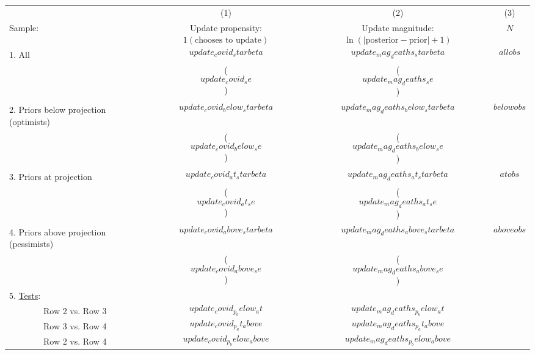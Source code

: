 \begin{tabular}{l c c c}
  \hline
  \hline
 & (1) & (2) & (3) \\ 
  Sample: & \shortstack{Update propensity: \\
  $1(\text{chooses to update})$} & \shortstack{Update magnitude: \\ $\ln(|\text{posterior} -
  \text{prior}|+1)$} & $N$ \\ 
  \hline  
1. All & $$update_covid_starbeta$$ & $$update_mag_deaths_starbeta$$ & $$allobs$$ \\
  & ($$update_covid_se$$) & ($$update_mag_deaths_se$$) \\
  \\
2. Priors below projection (optimists) & $$update_covid_below_starbeta$$
       & $$update_mag_deaths_below_starbeta$$ & 
 $$belowobs$$ \\
  & ($$update_covid_below_se$$) & ($$update_mag_deaths_below_se$$) \\
  \\
3. Priors at projection & $$update_covid_at_starbeta$$ & $$update_mag_deaths_at_starbeta$$
          & $$atobs$$ \\
  & ($$update_covid_at_se$$) & ($$update_mag_deaths_at_se$$) \\
  \\
4. Priors above projection (pessimists) & $$update_covid_above_starbeta$$ & $$update_mag_deaths_above_starbeta$$
          & $$aboveobs$$ \\
  & ($$update_covid_above_se$$) & ($$update_mag_deaths_above_se$$) \\
  \hline
  5. \ul{Tests}: \\
  \ \ \ \ \ \ \ \   Row 2 vs. Row 3 & $$update_covid_p_below_at$$
       & $$update_mag_deaths_p_below_at$$ \\  
  \ \ \ \ \ \ \ \   Row 3 vs. Row 4 & $$update_covid_p_at_above$$ 
             & $$update_mag_deaths_p_at_above$$ \\ 
  \ \ \ \ \ \ \ \  Row 2 vs. Row 4 & $$update_covid_p_below_above$$ & $$update_mag_deaths_p_below_above$$ \\   
  \hline   
  \hline 
\end{tabular}

